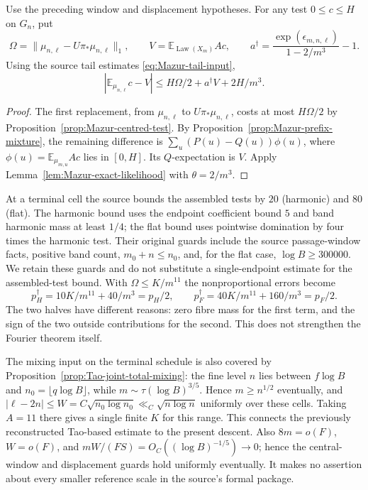 \begin{corollary}
\label{cor:Mazur-centred-descent}
Use the preceding window and displacement hypotheses. For any test
$0\le c\le H$ on $G_n$, put
\[
 \Omega=\|\mu_{n,\ell}-U\pi_*\mu_{n,\ell}\|_1,\qquad
 V=\mathbb E_{\operatorname{Law}(X_m)}Ac,\qquad
 a^\dagger=\frac{\exp(\epsilon_{m,n,\ell})}{1-2/m^3}-1 .
\]
Using the source tail estimates \eqref{eq:Mazur-tail-input},
\begin{equation}
 |\mathbb E_{\mu_{n,\ell}}c-V|
 \le H\Omega/2+a^\dagger V+2H/m^3.
 \label{eq:Mazur-centred-descent}
\end{equation}
\end{corollary}
\begin{proof}
The first replacement, from $\mu_{n,\ell}$ to $U\pi_*\mu_{n,\ell}$,
costs at most $H\Omega/2$ by Proposition~\ref{prop:Mazur-centred-test}.
By Proposition~\ref{prop:Mazur-prefix-mixture}, the remaining difference
is $\sum_u(P(u)-Q(u))\phi(u)$, where
$\phi(u)=\mathbb E_{\mu_{m,u}}Ac$ lies in $[0,H]$.
Its $Q$-expectation is $V$. Apply
Lemma~\ref{lem:Mazur-exact-likelihood} with $\theta=2/m^3$.
\end{proof}

At a terminal cell the source bounds the assembled tests by $20$
(harmonic) and $80$ (flat). The harmonic bound uses the endpoint
coefficient bound $5$ and band harmonic mass at least $1/4$;
the flat bound uses pointwise domination by four times the harmonic
test. Their original guards include the source passage-window facts,
positive band count, $m_0+n\le n_0$, and, for the flat case,
$\log B\ge300000$. We retain these guards and do not substitute a
single-endpoint estimate for the assembled-test bound.
With $\Omega\le K/m^{11}$ the nonproportional errors become
\[
 p_H^\dagger=10K/m^{11}+40/m^3=p_H/2,\qquad
 p_F^\dagger=40K/m^{11}+160/m^3=p_F/2.
\]
The two halves have different reasons: zero fibre mass for the first
term, and the sign of the two outside contributions for the second.
This does not strengthen the Fourier theorem itself.

The mixing input on the terminal schedule is also covered by
Proposition~\ref{prop:Tao-joint-total-mixing}: the fine level $n$ lies between
$f\log B$ and $n_0=\lfloor q\log B\rfloor$, while
$m\sim\tau(\log B)^{3/5}$. Hence $m\ge n^{1/2}$ eventually,
and $|\ell-2n|\le W=C\sqrt{n_0\log n_0}\ll_C\sqrt{n\log n}$
uniformly over these cells. Taking $A=11$ there gives a single finite
$K$ for this range. This connects the previously reconstructed Tao-based
estimate to the present descent. Also $8m=o(F)$, $W=o(F)$, and
$mW/(FS)=O_C((\log B)^{-1/5})\to0$; hence the central-window
and displacement guards hold uniformly eventually. It makes no assertion about every
smaller reference scale in the source's formal package.

